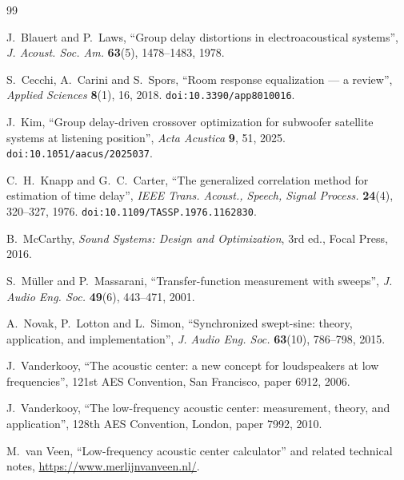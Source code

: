 \documentclass[11pt,a4paper]{article}
\begin{document}
\begin{thebibliography}{99}

J.~Blauert and P.~Laws,
``Group delay distortions in electroacoustical systems'',
\emph{J. Acoust. Soc. Am.} \textbf{63}(5), 1478--1483, 1978.

S.~Cecchi, A.~Carini and S.~Spors,
``Room response equalization --- a review'',
\emph{Applied Sciences} \textbf{8}(1), 16, 2018.
\texttt{doi:10.3390/app8010016}.

J.~Kim,
``Group delay-driven crossover optimization for subwoofer satellite systems at
listening position'',
\emph{Acta Acustica} \textbf{9}, 51, 2025.
\texttt{doi:10.1051/aacus/2025037}.

C.~H.~Knapp and G.~C.~Carter,
``The generalized correlation method for estimation of time delay'',
\emph{IEEE Trans. Acoust., Speech, Signal Process.} \textbf{24}(4), 320--327, 1976.
\texttt{doi:10.1109/TASSP.1976.1162830}.

B.~McCarthy,
\emph{Sound Systems: Design and Optimization}, 3rd ed., Focal Press, 2016.

S.~M\"uller and P.~Massarani,
``Transfer-function measurement with sweeps'',
\emph{J. Audio Eng. Soc.} \textbf{49}(6), 443--471, 2001.

A.~Novak, P.~Lotton and L.~Simon,
``Synchronized swept-sine: theory, application, and implementation'',
\emph{J. Audio Eng. Soc.} \textbf{63}(10), 786--798, 2015.

J.~Vanderkooy,
``The acoustic center: a new concept for loudspeakers at low frequencies'',
121st AES Convention, San Francisco, paper 6912, 2006.

J.~Vanderkooy,
``The low-frequency acoustic center: measurement, theory, and application'',
128th AES Convention, London, paper 7992, 2010.

M.~van Veen,
``Low-frequency acoustic center calculator'' and related technical notes,
\url{https://www.merlijnvanveen.nl/}.

\end{thebibliography}
\end{document}
